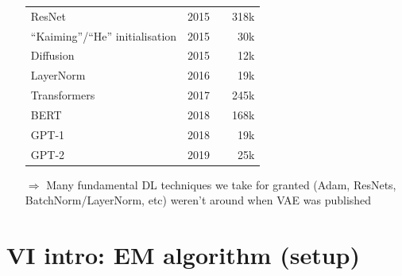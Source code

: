 \documentclass{article}
\begin{document}
\begin{itemize}
\begin{center}
\begin{tabular}{l c l r}
            ResNet & 2015 & \cite{he2016deep} & 318k \\
            ``Kaiming''/``He'' initialisation & 2015 & \cite{he2015delving} & 30k \\
            Diffusion & 2015 & \cite{sohl2015deep} & 12k \\
            LayerNorm & 2016 & \cite{ba2016layer} & 19k \\
            Transformers & 2017 & \cite{vaswani2017attention} & 245k \\
            BERT & 2018 & \cite{devlin2019bert} & 168k \\
            GPT-1 & 2018 & \cite{radford2018improving} & 19k \\
            GPT-2 & 2019 & \cite{radford2019language} & 25k \\
            \hline
        \end{tabular}
    \end{center}
    \item[$\Rightarrow$] Many fundamental DL techniques we take for granted (Adam, ResNets, BatchNorm/LayerNorm, etc) weren't around when VAE was published
\end{itemize}

\newpage
\section{VI intro: EM algorithm (setup)}
\end{document}
